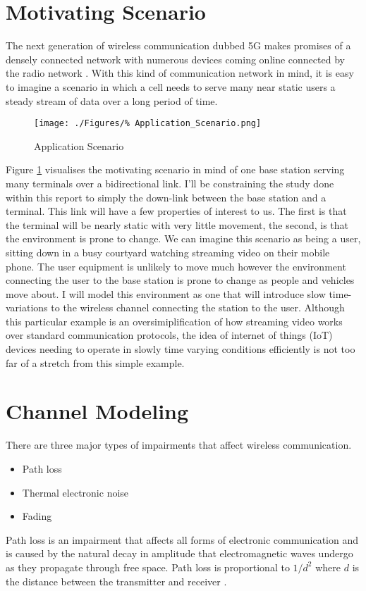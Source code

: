 \section{Motivating Scenario}
\label{sec:MotivatingScenario}
The next generation of wireless communication %
dubbed 5G makes promises of a densely connected %
network with numerous devices coming online %
connected by the radio network \cite{Demestichas13,Hossain15}. %
With this kind of communication network in mind, it is easy %
to imagine a scenario in which a cell needs %
to serve many near static users a steady stream %
of data over a long period of time.%
\begin{figure}[ht]
	\texttt{[image: ./Figures/\%
	Application\_Scenario.png]}
	\caption{Application Scenario}
	\label{fig:AppScene}
\end{figure}
Figure \ref{fig:AppScene} visualises the motivating %
scenario in mind of one base station serving many %
terminals over a bidirectional link. I'll be constraining %
the study done within this report to simply the down-link %
between the base station and a terminal. This link will %
have a few properties of interest to us. The first is that %
the terminal will be nearly static with very little movement, %
the second, is that the environment is prone to change. We can %
imagine this scenario as being a user, sitting down in a busy %
courtyard watching streaming video on their mobile phone. The %
user equipment is unlikely to move much however the environment %
connecting the user to the base station is prone to change as %
people and vehicles move about. I will model this environment %
as one that will introduce slow time-variations to the wireless %
channel connecting the station to the user. Although this %
particular example is an oversimiplification of how streaming %
video works over standard communication protocols, the idea %
of internet of things (IoT) devices needing to operate in %
slowly time varying conditions efficiently is not too far %
of a stretch from this simple example.

\section{Channel Modeling}

There are three major types of impairments that affect %
wireless communication.
\begin{itemize}
	\item{Path loss}
	\item{Thermal electronic noise}
	\item{Fading}
\end{itemize}
Path loss is an impairment that affects %
all forms of electronic communication and is %
caused by the natural decay in amplitude %
that electromagnetic waves undergo as they %
propagate through free space. Path loss %
is proportional to $1/d^2$ where %
$d$ is the distance between the transmitter %
and receiver \cite{Sklar01}.

